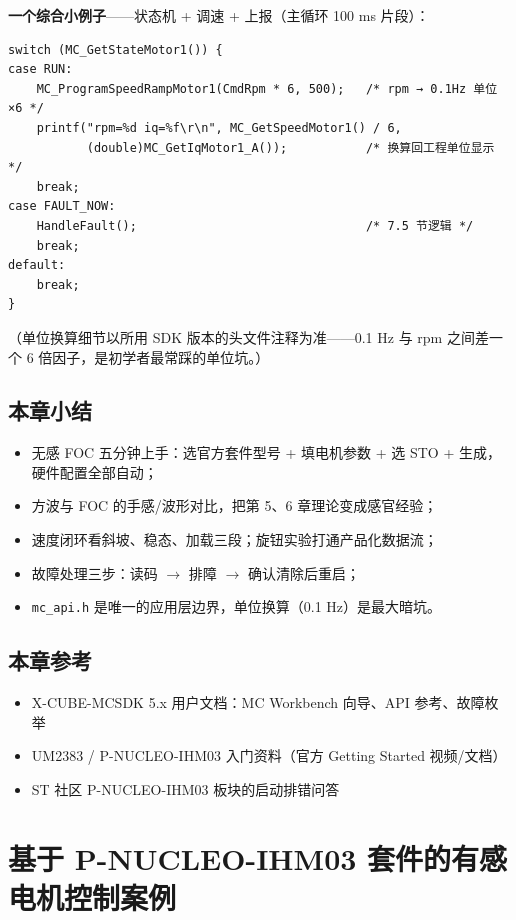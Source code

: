 \documentclass[
  UTF8,
  scheme=plain,
  fontsize=10pt,
  openany
]{ctexbook}
\begin{document}
\textbf{一个综合小例子}------状态机 + 调速 + 上报（主循环 100 ms
片段）：

\begin{verbatim}
switch (MC_GetStateMotor1()) {
case RUN:
    MC_ProgramSpeedRampMotor1(CmdRpm * 6, 500);   /* rpm → 0.1Hz 单位 ×6 */
    printf("rpm=%d iq=%f\r\n", MC_GetSpeedMotor1() / 6,
           (double)MC_GetIqMotor1_A());           /* 换算回工程单位显示 */
    break;
case FAULT_NOW:
    HandleFault();                                /* 7.5 节逻辑 */
    break;
default:
    break;
}
\end{verbatim}

（单位换算细节以所用 SDK 版本的头文件注释为准------0.1 Hz 与 rpm
之间差一个 6 倍因子，是初学者最常踩的单位坑。）

\section{本章小结}\label{ux672cux7ae0ux5c0fux7ed3-6}

\begin{itemize}
\tightlist
\item
  无感 FOC 五分钟上手：选官方套件型号 + 填电机参数 + 选 STO +
  生成，硬件配置全部自动；
\item
  方波与 FOC 的手感/波形对比，把第 5、6 章理论变成感官经验；
\item
  速度闭环看斜坡、稳态、加载三段；旋钮实验打通产品化数据流；
\item
  故障处理三步：读码 \(\rightarrow\) 排障 \(\rightarrow\)
  确认清除后重启；
\item
  \texttt{mc\_api.h} 是唯一的应用层边界，单位换算（0.1 Hz）是最大暗坑。
\end{itemize}

\section{本章参考}\label{ux672cux7ae0ux53c2ux8003-6}

\begin{itemize}
\tightlist
\item
  X-CUBE-MCSDK 5.x 用户文档：MC Workbench 向导、API 参考、故障枚举
\item
  UM2383 / P-NUCLEO-IHM03 入门资料（官方 Getting Started 视频/文档）
\item
  ST 社区 P-NUCLEO-IHM03 板块的启动排错问答
\end{itemize}

\clearpage

\chapter{基于 P-NUCLEO-IHM03
套件的有感电机控制案例}\label{ux57faux4e8e-p-nucleo-ihm03-ux5957ux4ef6ux7684ux6709ux611fux7535ux673aux63a7ux5236ux6848ux4f8b}
\end{document}
